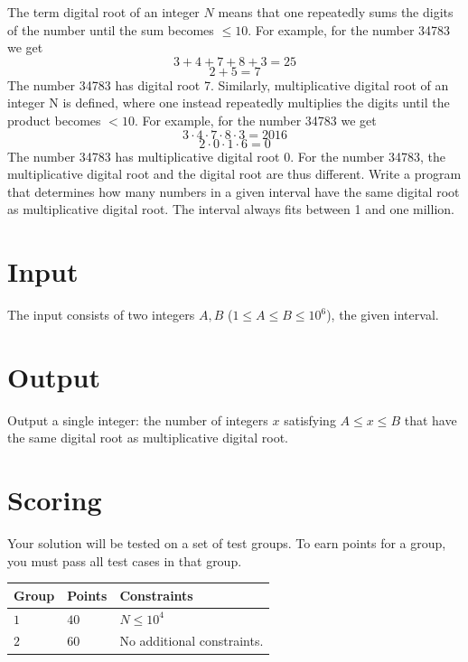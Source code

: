 The term digital root of an integer $N$ means that one repeatedly sums the digits of the number until the sum becomes $\le 10$. For example, for the number 34783 we get
$$3 + 4 + 7 + 8 + 3 = 25$$
$$2+5=7$$
The number 34783 has digital root 7.
Similarly, multiplicative digital root of an integer N is defined, where one instead repeatedly multiplies the digits until the product becomes $< 10$. For example, for the number 34783 we get
$$3 \cdot 4 \cdot 7 \cdot 8 \cdot 3 = 2016$$
$$2 \cdot 0 \cdot 1 \cdot 6 = 0$$
The number 34783 has multiplicative digital root 0. For the number 34783, the multiplicative digital root and the digital root are thus different.
Write a program that determines how many numbers in a given interval have the same digital root as multiplicative digital root. The interval always fits between 1 and one million.

\section*{Input}
The input consists of two integers $A,B$ ($1 \le A \le B \le 10^6$), the given interval.

\section*{Output}
Output a single integer: the number of integers $x$ satisfying $A \leq x \leq B$ that have the same digital root as multiplicative digital root.

\section*{Scoring}
Your solution will be tested on a set of test groups.
To earn points for a group, you must pass all test cases in that group.

\noindent
\begin{tabular}{| l | l | p{12cm} |}
  \hline
  \textbf{Group} & \textbf{Points} & \textbf{Constraints} \\ \hline
  $1$    & $40$          & $N \leq 10^4$  \\ \hline
  $2$    & $60$          & No additional constraints.  \\ \hline
\end{tabular}
